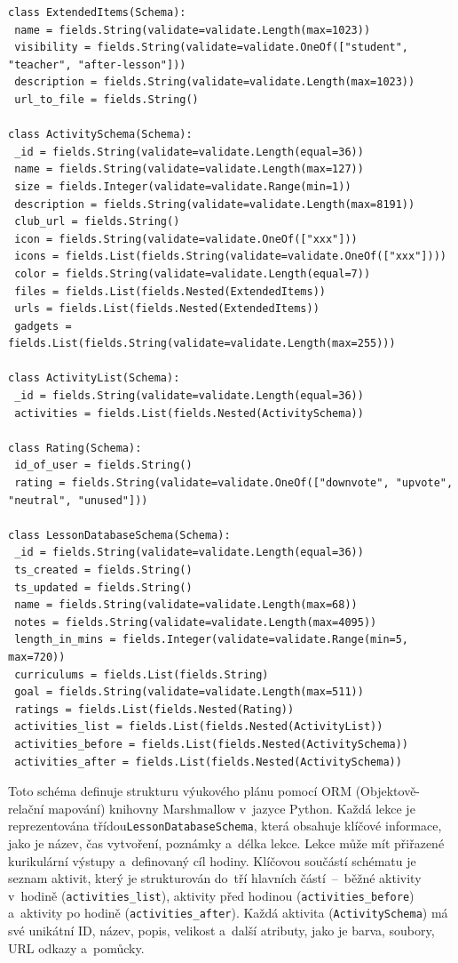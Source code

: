 \documentclass[male,czech,api_bc]{kitheses}
\begin{document}
\newpage %

\begin{lstlisting}
class ExtendedItems(Schema):
 name = fields.String(validate=validate.Length(max=1023))
 visibility = fields.String(validate=validate.OneOf(["student", "teacher", "after-lesson"]))
 description = fields.String(validate=validate.Length(max=1023))
 url_to_file = fields.String()

class ActivitySchema(Schema):
 _id = fields.String(validate=validate.Length(equal=36))
 name = fields.String(validate=validate.Length(max=127))
 size = fields.Integer(validate=validate.Range(min=1))
 description = fields.String(validate=validate.Length(max=8191))
 club_url = fields.String()
 icon = fields.String(validate=validate.OneOf(["xxx"]))
 icons = fields.List(fields.String(validate=validate.OneOf(["xxx"])))
 color = fields.String(validate=validate.Length(equal=7))
 files = fields.List(fields.Nested(ExtendedItems))
 urls = fields.List(fields.Nested(ExtendedItems))
 gadgets = fields.List(fields.String(validate=validate.Length(max=255)))
	
class ActivityList(Schema):
 _id = fields.String(validate=validate.Length(equal=36))
 activities = fields.List(fields.Nested(ActivitySchema))
	
class Rating(Schema):
 id_of_user = fields.String()
 rating = fields.String(validate=validate.OneOf(["downvote", "upvote", "neutral", "unused"]))
	
class LessonDatabaseSchema(Schema):
 _id = fields.String(validate=validate.Length(equal=36))
 ts_created = fields.String()
 ts_updated = fields.String()
 name = fields.String(validate=validate.Length(max=68))
 notes = fields.String(validate=validate.Length(max=4095))
 length_in_mins = fields.Integer(validate=validate.Range(min=5, max=720))
 curriculums = fields.List(fields.String)
 goal = fields.String(validate=validate.Length(max=511))
 ratings = fields.List(fields.Nested(Rating))
 activities_list = fields.List(fields.Nested(ActivityList))
 activities_before = fields.List(fields.Nested(ActivitySchema))
 activities_after = fields.List(fields.Nested(ActivitySchema))
\end{lstlisting}

Toto schéma definuje strukturu výukového plánu pomocí ORM (Objektově-relační mapování) knihovny Marshmallow v~jazyce Python. Každá lekce je reprezentována třídou\break\texttt{LessonDatabaseSchema}, která obsahuje klíčové informace, jako je název, čas vytvoření, poznámky a~délka lekce. Lekce může mít přiřazené kurikulární výstupy a~definovaný cíl hodiny. Klíčovou součástí schématu je seznam aktivit, který je strukturován do~tří hlavních částí~--~běžné aktivity v~hodině (\texttt{activities\_list}), aktivity před hodinou (\texttt{activities\_before}) a~aktivity po hodině (\texttt{activities\_after}). Každá aktivita (\texttt{ActivitySchema}) má své unikátní ID, název, popis, velikost a~další atributy, jako je barva, soubory, URL odkazy a~pomůcky.
\end{document}
